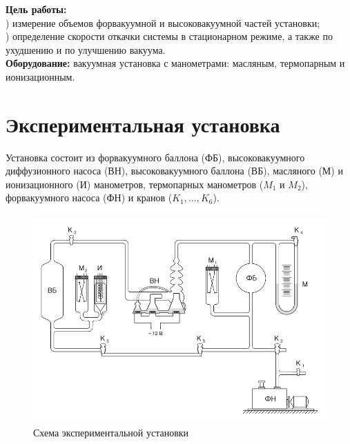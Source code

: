 \textbf{Цель работы:} \\) измерение объемов форвакуумной и высоковакуумной частей установки;\\) определение скорости откачки системы в стационарном режиме, а также 
по ухудшению и по улучшению вакуума. \\\indent
\textbf{Оборудование:} вакуумная установка с манометрами: масляным, 
термопарным и ионизационным. \\ 
\section*{Экспериментальная установка}

Установка состоит из форвакуумного баллона (ФБ), высоковакуумного диффузионного
насоса (ВН), высоковакуумного баллона (ВБ), масляного (М) и ионизационного (И) манометров,
термопарных манометров ($M_1$ и $M_2$), форвакуумного насоса (ФН) и кранов 
($K_1, \dots, K_6$).

\begin{figure}[h!]
    \centering
    \includegraphics[height=8cm]{setup.png}
    \caption{Схема экспериментальной установки}
\end{figure}

\newpage

%
%

